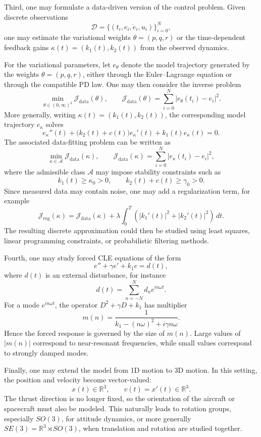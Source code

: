 ﻿\documentclass[12pt]{article}
\begin{document}
Third, one may formulate a data-driven version of the control problem. 
Given discrete observations
\[
 \mathcal D
 =
 \{(t_i, e_i,\dot e_i, u_i)\}_{i = 0}^{N},
\]
one may estimate the variational weights
$\theta = (p, q, r)$ or the time-dependent feedback gains $\kappa(t) = (k_1(t), k_2(t))$ from the observed dynamics.

For the variational parameters, let $e_\theta$ denote the model trajectory generated by the weights $\theta=(p,q,r)$, either through the Euler--Lagrange equation or through the compatible PD law. 
One may then consider the inverse problem
\[
 \min_{\theta \in (0, \infty)^3}
 \mathcal J_{\mathrm{data}}(\theta),
 \qquad
 \mathcal J_{\mathrm{data}}(\theta)
 =
 \sum_{i = 0}^{N}
 \left|e_\theta(t_i) - e_i\right|^2.
\]
More generally, writing $\kappa(t)=(k_1(t),k_2(t))$, the corresponding model trajectory $e_\kappa$ solves
\[
 e_\kappa''(t)
 +
 \bigl(k_2(t) + c(t)\bigr)e_\kappa'(t)
 +
 k_1(t)e_\kappa(t)
 =
 0.
\]
The associated data-fitting problem can be written as
\[
 \min_{\kappa \in \mathcal A}
 \mathcal J_{\mathrm{data}}(\kappa),
 \qquad
 \mathcal J_{\mathrm{data}}(\kappa)
 =
 \sum_{i = 0}^{N}
 \left|e_\kappa(t_i) - e_i\right|^2,
\]
where the admissible class $\mathcal A$ may impose stability constraints such as
\[
 k_1(t) \geq \kappa_0 > 0,
 \qquad
 k_2(t) + c(t) \geq \gamma_0 > 0.
\]
Since measured data may contain noise, one may add a regularization term, for example
\[
 \mathcal J_{\mathrm{reg}}(\kappa)
 =
 \mathcal J_{\mathrm{data}}(\kappa)
 +
 \lambda \int_0^T
 \left(|k_1'(t)|^2 + |k_2'(t)|^2\right)\, dt.
\]
The resulting discrete approximation could then be studied using least squares, linear programming constraints, or probabilistic filtering methods. 

Fourth, one may study forced CLE equations of the form
\[
 e'' + \gamma e' + k_1e = d(t),
\]
where $d(t)$ is an external disturbance, for instance
\[
 d(t) = \sum_{n = -N}^{N}d_ne^{in\omega t}.
\]
For a mode $e^{in\omega t}$, the operator
$
 D^2 + \gamma D + k_1
$
has multiplier
\[
 m(n) = \frac{1}{k_1 - (n\omega)^2 + i\gamma n\omega}.
\]
Hence the forced response is governed by the size of $m(n)$. 
Large values of $|m(n)|$ correspond to near-resonant frequencies, while small values correspond to strongly damped modes. 

Finally, one may extend the model from 1D motion to 3D motion. 
In this setting, the position and velocity become vector-valued:
\[
 x(t) \in \mathbb R^3,
 \qquad
 v(t) = x'(t) \in \mathbb R^3.
\]
The thrust direction is no longer fixed, so the orientation of the aircraft or spacecraft must also be modeled. 
This naturally leads to rotation groups, especially
$SO(3)$, for attitude dynamics, or more generally $SE(3) = \mathbb R^3\rtimes SO(3)$, when translation and rotation are studied together. 
\end{document}
